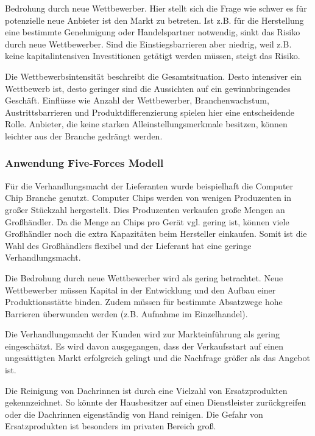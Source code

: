         \noindent
        Bedrohung durch neue Wettbewerber. Hier stellt sich die Frage wie schwer es für potenzielle neue Anbieter ist
        den Markt zu betreten. Ist z.B. für die Herstellung eine bestimmte Genehmigung oder Handelspartner notwendig,
        sinkt das Risiko durch neue Wettbewerber. Sind die Einstiegsbarrieren aber niedrig, weil z.B. keine 
        kapitalintensiven Investitionen getätigt werden müssen, steigt das Risiko.

        \noindent
        Die Wettbewerbsintensität beschreibt die Gesamtsituation. Desto intensiver ein Wettbewerb ist, desto geringer
        sind die Aussichten auf ein gewinnbringendes Geschäft. Einflüsse wie Anzahl der Wettbewerber, Branchenwachstum,
        Austrittsbarrieren und Produktdifferenzierung spielen hier eine entscheidende Rolle. Anbieter, die keine starken
        Alleinstellungsmerkmale besitzen, können leichter aus der Branche gedrängt werden.

        \noindent
        \subsubsection{Anwendung Five-Forces Modell}

        \noindent
        Für die Verhandlungsmacht der Lieferanten wurde beispielhaft die Computer Chip Branche genutzt. Computer Chips
        werden von wenigen Produzenten in großer Stückzahl hergestellt. Dies Produzenten verkaufen große Mengen an
        Großhändler. Da die Menge an Chips pro Gerät vgl. gering ist, können viele Großhändler noch die extra
        Kapazitäten beim Hersteller einkaufen. Somit ist die Wahl des Großhändlers flexibel und der Lieferant hat eine
        geringe Verhandlungsmacht.

        \noindent
        Die Bedrohung durch neue Wettbewerber wird als gering betrachtet. Neue Wettbewerber müssen Kapital in der
        Entwicklung und den Aufbau einer Produktionsstätte binden. Zudem müssen für bestimmte Absatzwege hohe Barrieren
        überwunden werden (z.B. Aufnahme im Einzelhandel).

        \noindent
        Die Verhandlungsmacht der Kunden wird zur Markteinführung als gering eingeschätzt. Es wird davon ausgegangen,
        dass der Verkaufsstart auf einen ungesättigten Markt erfolgreich gelingt und die Nachfrage größer als das
        Angebot ist.

        \noindent
        Die Reinigung von Dachrinnen ist durch eine Vielzahl von Ersatzprodukten gekennzeichnet. So könnte der
        Hausbesitzer auf einen Dienstleister zurückgreifen oder die Dachrinnen eigenständig von Hand reinigen. Die
        Gefahr von Ersatzprodukten ist besonders im privaten Bereich groß.

